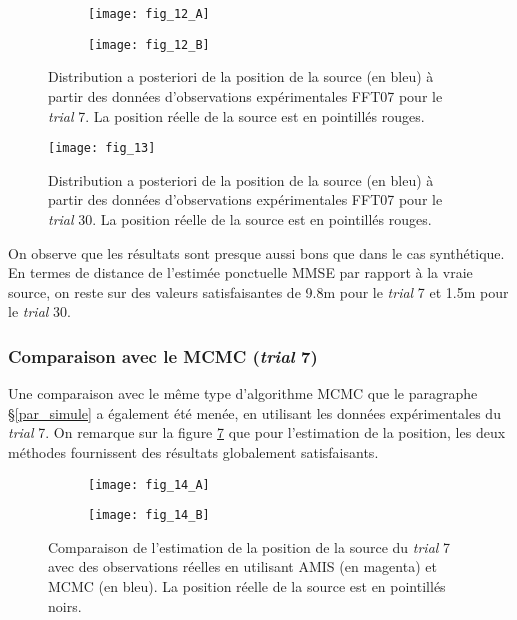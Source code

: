 \begin{figure}[h!]
	\centering
	\begin{subfigure}[t]{0.5\textwidth}
		\centering
		\texttt{[image: fig\_12\_A]}
		\caption{}
		\label{fig_12_A}
	\end{subfigure}%
	\begin{subfigure}[t]{0.5\textwidth}
		\centering
		\texttt{[image: fig\_12\_B]}
		\caption{}
		\label{fig_12_B}
	\end{subfigure}
	\caption{Distribution a posteriori de la position de la source (en bleu) à partir des données d'observations expérimentales FFT07 pour le \textit{trial} 7. La position réelle de la source est en pointillés rouges.} 
	\label{fig_12_AE}		
\end{figure}

\begin{figure}[h!]
	\centering
	\texttt{[image: fig\_13]}
	\caption{Distribution a posteriori de la position de la source (en bleu) à partir des données d'observations expérimentales FFT07 pour le \textit{trial} 30. La position réelle de la source est en pointillés rouges.}
	\label{fig_13_AE}
\end{figure}

On observe que les résultats sont presque aussi bons que dans le cas synthétique. En termes de distance de l'estimée ponctuelle MMSE par rapport à la vraie source, on reste sur des valeurs satisfaisantes de 9.8m pour le \textit{trial} 7 et 1.5m pour le \textit{trial} 30. 

\subsubsection{Comparaison avec le MCMC (\textit{trial} 7)}

Une comparaison avec le même type d'algorithme MCMC que le paragraphe §\ref{par_simule} a également été menée, en utilisant les données expérimentales du \textit{trial} 7. On remarque sur la figure \ref{fig_14_AE} que pour l'estimation de la position, les deux méthodes fournissent des résultats globalement satisfaisants. \\

\begin{figure}[h!]
	\centering
	\begin{subfigure}[t]{0.5\textwidth}
		\centering
		\texttt{[image: fig\_14\_A]}
		\caption{}
		\label{fig_14_A}
	\end{subfigure}%
	\centering
	\begin{subfigure}[t]{0.5\textwidth}
		\centering
		\texttt{[image: fig\_14\_B]}
		\caption{}
		\label{fig_14_B}
	\end{subfigure}
	\caption{Comparaison de l'estimation de la position de la source du \textit{trial} 7 avec des observations réelles en utilisant AMIS (en magenta) et MCMC (en bleu). La position réelle de la source est en pointillés noirs.}
	\label{fig_14_AE} 
\end{figure}

